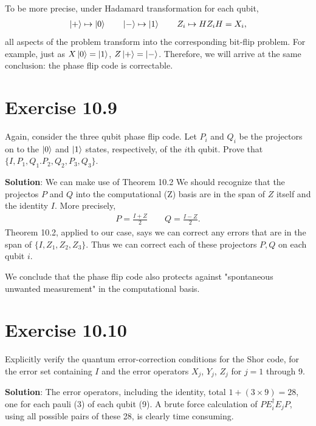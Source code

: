 \documentclass{book}
\begin{document}
    To be more precise, under Hadamard transformation for each qubit,
    \begin{align}
        \ket{+} \mapsto \ket{0} \qquad \ket{-} \mapsto \ket{1} \qquad Z_i \mapsto H Z_i H = X_i,
    \end{align}
    all aspects of the problem transform into the corresponding bit-flip problem. For example, just as $X\ket{0} = \ket{1}$, $Z \ket{+} = \ket{-}$. Therefore, we will arrive at the same conclusion: the phase flip code is correctable.

\section*{Exercise 10.9}
    Again, consider the three qubit phase flip code. Let $P_i$ and $Q_i$ be the projectors on to the $\ket{0}$ and $\ket{1}$ states, respectively, of the $i$th qubit. Prove that $\{I, P_1, Q_1. P_2, Q_2, P_3, Q_3\}$.

    \textbf{Solution}: We can make use of Theorem 10.2 We should recognize that the projectos $P$ and $Q$ into the computational (Z) basis are in the span of $Z$ itself and the identity $I$. More precisely,
    \begin{align}
        P = \frac{I + Z}{2} \qquad
        Q = \frac{I - Z}{2}.
    \end{align}
    Theorem 10.2, applied to our case, says we can correct any errors that are in the span of $\{I, Z_1, Z_2, Z_3\}$. Thus we can correct each of these projectors $P, Q$ on each qubit $i$. 

    We conclude that the phase flip code also protects against "spontaneous unwanted measurement" in the computational basis. 

\section*{Exercise 10.10}
    Explicitly verify the quantum error-correction conditions for the Shor code, for the error set containing $I$ and the error operators $X_j$, $Y_j$, $Z_j$ for $j = 1$ through 9. 

    \textbf{Solution}: The error operators, including the identity, total $1 + (3\times 9) = 28$, one for each pauli (3) of each qubit (9). A brute force calculation of $P E_i^\dagger E_j P$, using all possible pairs of these 28, is clearly time consuming. 
    
\end{document}
